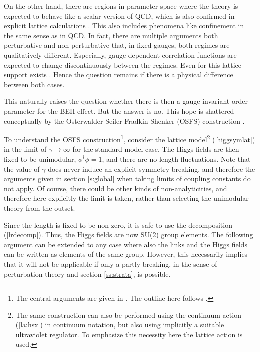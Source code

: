 \documentclass[final,12pt,3p,longtitle]{elsarticle}
\newcommand*{\pref}[1]{(\ref{#1})}
\newcommand*{\1}{1\!\!\!\bot}
\begin{document}
On the other hand, there are regions in parameter space where the theory is expected to behave like a scalar version of QCD, which is also confirmed in explicit lattice calculations \cite{Knechtli:1998gf,Knechtli:1999qe,Maas:2010nc,Maas:2013aia,Maas:2014pba}. This also includes phenomena like confinement in the same sense as in QCD. In fact, there are multiple arguments both perturbative \cite{Bohm:2001yx,Kapusta:2006pm,Damgaard:1985nb} and non-perturbative \cite{Kugo:1979gm,Schaden:2013ffa,Alkofer:2000wg,Fischler:1974ue,Nielsen:1975fs,Greensite:2017ajx,Bricmont:1985sw,Bricmont:1985by,Bricmont:1987zh} that, in fixed gauges, both regimes are qualitatively different. Especially, gauge-dependent correlation functions are expected to change discontinuously between the regimes. Even for this lattice support exists \cite{Maas:2013aia}. Hence the question remains if there is a physical difference between both cases.

This naturally raises the question whether there is then a gauge-invariant order parameter for the BEH effect. But the answer is no. This hope is shattered conceptually by the Osterwalder-Seiler-Fradkin-Shenker (OSFS) construction \cite{Osterwalder:1977pc,Fradkin:1978dv,Seiler:2015rwa,Seiler:1982pw,Glimm:1987ng}.

To understand the OSFS construction\footnote{The central arguments are given in \cite{Osterwalder:1977pc}. The outline here follows \cite{Fradkin:1978dv}.}, consider the lattice model\footnote{The same construction can also be performed using the continuum action \pref{la:hsx} in continuum notation, but also using implicitly a suitable ultraviolet regulator. To emphasize this necessity here the lattice action is used.} \pref{higgsymlat} in the limit of $\gamma\to\infty$ for the standard-model case. The Higgs fields are then fixed to be unimodular, $\phi^\dagger\phi=1$, and there are no length fluctuations. Note that the value of $\gamma$ does never induce an explicit symmetry breaking, and therefore the arguments given in section \ref{s:global} when taking limits of coupling constants do not apply. Of course, there could be other kinds of non-analyticities, and therefore here explicitly the limit is taken, rather than selecting the unimodular theory from the outset.

Since the length is fixed to be non-zero, it is safe to use the decomposition \pref{lrdecomp}. Thus, the Higgs fields are now SU(2) group elements. The following argument can be extended to any case where also the links and the Higgs fields can be written as elements of the same group. However, this necessarily implies that it will not be applicable if only a partly breaking, in the sense of perturbation theory and section \ref{ss:strata}, is possible.
\end{document}
